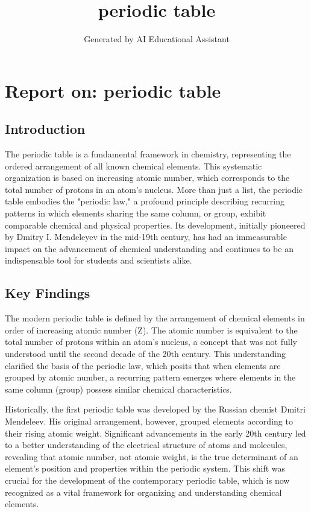 \documentclass[12pt, a4paper]{article}
\title{periodic table}
\author{Generated by AI Educational Assistant}
\date{}
\begin{document}
\maketitle
\thispagestyle{fancy}

\section*{Report on: periodic table}

\subsection*{Introduction}
The periodic table is a fundamental framework in chemistry, representing the ordered arrangement of all known chemical elements. This systematic organization is based on increasing atomic number, which corresponds to the total number of protons in an atom's nucleus. More than just a list, the periodic table embodies the "periodic law," a profound principle describing recurring patterns in which elements sharing the same column, or group, exhibit comparable chemical and physical properties. Its development, initially pioneered by Dmitry I. Mendeleyev in the mid-19th century, has had an immeasurable impact on the advancement of chemical understanding and continues to be an indispensable tool for students and scientists alike.

\subsection*{Key Findings}
The modern periodic table is defined by the arrangement of chemical elements in order of increasing atomic number (Z). The atomic number is equivalent to the total number of protons within an atom's nucleus, a concept that was not fully understood until the second decade of the 20th century. This understanding clarified the basis of the periodic law, which posits that when elements are grouped by atomic number, a recurring pattern emerges where elements in the same column (group) possess similar chemical characteristics.

Historically, the first periodic table was developed by the Russian chemist Dmitri Mendeleev. His original arrangement, however, grouped elements according to their rising atomic weight. Significant advancements in the early 20th century led to a better understanding of the electrical structure of atoms and molecules, revealing that atomic number, not atomic weight, is the true determinant of an element's position and properties within the periodic system. This shift was crucial for the development of the contemporary periodic table, which is now recognized as a vital framework for organizing and understanding chemical elements.
\end{document}
